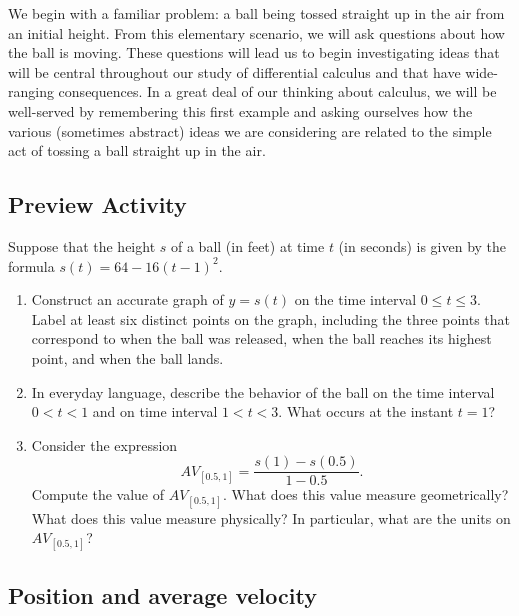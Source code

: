 \documentclass[10pt,]{book}
\theoremstyle{plain}
\theoremstyle{definition}
\theoremstyle{definition}
\theoremstyle{definition}
\theoremstyle{definition}
\theoremstyle{definition}
\numberwithin{equation}{section}
\newcommand{\lt}{ < }
\begin{document}
We begin with a familiar problem: a ball being tossed straight up in the air from an initial height. From this elementary scenario, we will ask questions about how the ball is moving. These questions will lead us to begin investigating ideas that will be central throughout our study of differential calculus and that have wide-ranging consequences. In a great deal of our thinking about calculus, we will be well-served by remembering this first example and asking ourselves how the various (sometimes abstract) ideas we are considering are related to the simple act of tossing a ball straight up in the air.
%
\typeout{************************************************}
\typeout{************************************************}
\subsection[{Preview Activity}]{Preview Activity}\label{PA-1-1}

Suppose that the height \(s\) of a ball (in feet) at time \(t\) (in seconds) is given by the formula \(s(t) = 64 - 16(t-1)^2\).
%
\leavevmode%
\begin{enumerate}[label=\alph*]
\item\hypertarget{li-5}{}Construct an accurate graph of \(y = s(t)\) on the time interval \(0 \le t \le 3\).  Label at least six distinct points on the graph, including the three points that correspond to when the ball was released, when the ball reaches its highest point, and when the ball lands.%
\item\hypertarget{li-6}{}In everyday language, describe the behavior of the ball on the time interval \(0 \lt  t \lt  1\) and on time interval \(1 \lt  t \lt  3\).  What occurs at the instant \(t = 1\)?%
\item\hypertarget{li-7}{}Consider the expression 	
      \begin{equation*}
        AV_{[0.5,1]} = \frac{s(1) - s(0.5)}{1-0.5}.
      \end{equation*}
    Compute the value of \(AV_{[0.5,1]}\).  What does this value measure geometrically?  What does this value measure physically?  In particular, what are the units on \(AV_{[0.5,1]}\)?%
\end{enumerate}
\typeout{************************************************}
\typeout{************************************************}
\subsection[{Position and average velocity}]{Position and average velocity}\label{subsection-2}
\end{document}
